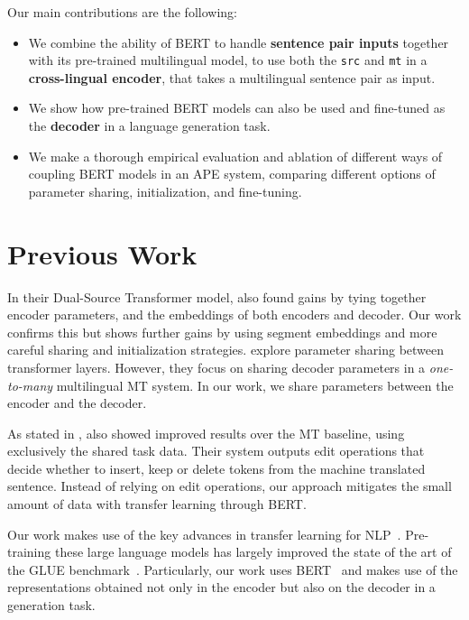 Our main contributions are the following:
\begin{itemize}
    \item We combine the ability of BERT to
          handle {\bf sentence pair inputs} together with its pre-trained
          multilingual model, to use both the {\tt src} and {\tt mt} in a
              {\bf cross-lingual encoder}, that takes a multilingual
          sentence pair as input.
    \item We show how pre-trained BERT models can also be used and
          fine-tuned as the {\bf decoder} in a language generation task.
    \item We make a thorough empirical evaluation and ablation of different ways of
          coupling BERT models in an APE system, comparing different options
          of parameter sharing, initialization, and fine-tuning.
\end{itemize}

\section{Previous Work}

\noindent In their Dual-Source Transformer model, \citet{junczys2018ms} also
found gains by tying together encoder parameters, and the embeddings
of both encoders and decoder. Our work confirms this but shows
further gains by using segment embeddings and more careful sharing
and initialization strategies. \citet{sachan2018parameter} explore
parameter sharing between transformer layers. However, they focus on
sharing decoder parameters in a \emph{one-to-many} multilingual MT
system. In our work, we share parameters between the encoder and the
decoder.

As stated in , \citet{berard2017lig} also
showed improved results over the MT baseline, using exclusively the
shared task data. Their system outputs edit operations that decide
whether to insert, keep or delete tokens from the machine translated
sentence. Instead of relying on edit operations, our approach
mitigates the small amount of data with transfer learning through
BERT.

Our work makes use of the key advances in transfer learning for
NLP~\citep{peters2018deep, howard2018universal, radford2018improving,
    devlin2018bert}. Pre-training these large language models has largely
improved the state of the art of the GLUE
benchmark~\citep{wang2018glue}. Particularly, our work uses
BERT~\citep{devlin2018bert} and makes use of the representations
obtained not only in the encoder but also on the decoder in a
generation task.

